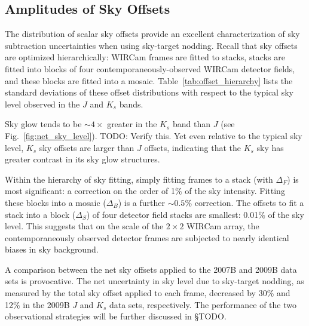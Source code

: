 \documentclass[iop]{emulateapj}
\newcommand{\todo}[1]{\textcolor{RedOrange}{#1}} %
\newcommand{\Fig}[1]{Fig.~\ref{fig:#1}}  %
\begin{document}
\subsection{Amplitudes of Sky Offsets}
\label{sec:offset_amplitudes}

The distribution of scalar sky offsets provide an excellent characterization of sky subtraction uncertainties when using sky-target nodding.
Recall that sky offsets are optimized hierarchically: WIRCam frames are fitted to stacks, stacks are fitted into blocks of four contemporaneously-observed WIRCam detector fields, and these blocks are fitted into a mosaic.
Table~\ref{tab:offset_hierarchy} lists the standard deviations of these offset distributions with respect to the typical sky level observed in the $J$ and $K_s$ bands.

Sky glow tends to be $\sim 4\times$ greater in the $K_s$ band than $J$ (see \Fig{net_sky_level}).
\todo{TODO: Verify this.}
Yet even relative to the typical sky level, $K_s$ sky offsets are larger than $J$ offsets, indicating that the $K_s$ sky has greater contrast in its sky glow structures.

Within the hierarchy of sky fitting, simply fitting frames to a stack (with $\Delta_F$) is most significant: a correction on the order of 1\% of the sky intensity.
Fitting these blocks into a mosaic ($\Delta_B$) is a further $\sim 0.5\%$ correction.
The offsets to fit a stack into a block ($\Delta_S$) of four detector field stacks are smallest: 0.01\% of the sky level.
This suggests that on the scale of the $2\times 2$ WIRCam array, the contemporaneously observed detector frames are subjected to nearly identical biases in sky background.

A comparison between the net sky offsets applied to the 2007B and 2009B data sets is provocative.
The net uncertainty in sky level due to sky-target nodding, as measured by the total sky offset applied to each frame, decreased by 30\% and 12\% in the 2009B $J$ and $K_s$ data sets, respectively.
The performance of the two observational strategies will be further discussed in \S\todo{TODO}.
\end{document}
